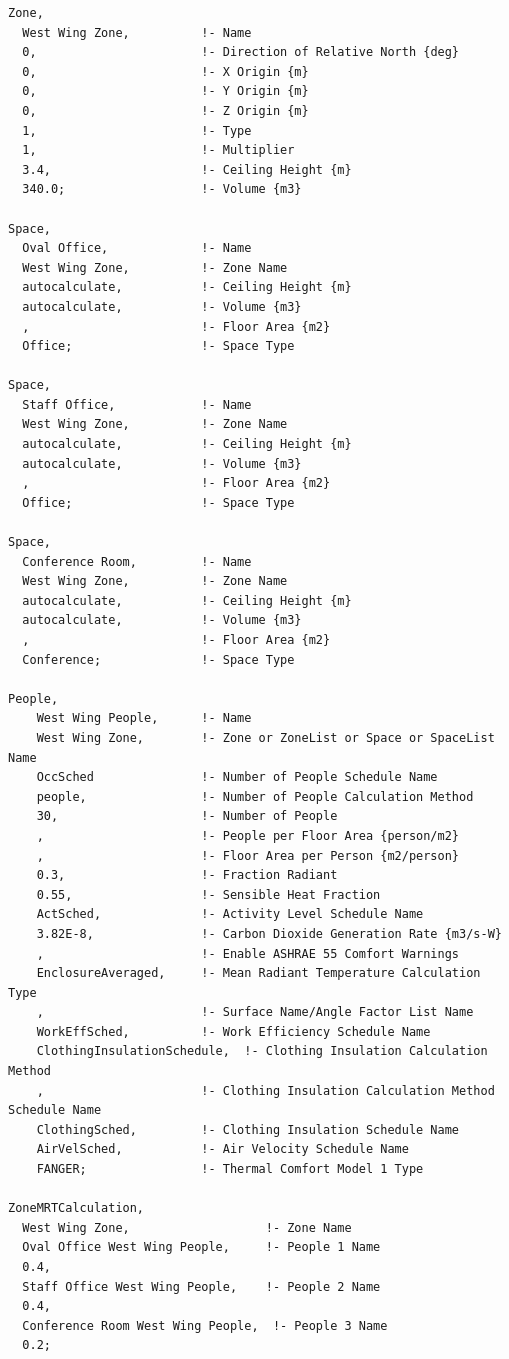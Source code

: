 \begin{lstlisting}
Zone,
  West Wing Zone,          !- Name
  0,                       !- Direction of Relative North {deg}
  0,                       !- X Origin {m}
  0,                       !- Y Origin {m}
  0,                       !- Z Origin {m}
  1,                       !- Type
  1,                       !- Multiplier
  3.4,                     !- Ceiling Height {m}
  340.0;                   !- Volume {m3}

Space,
  Oval Office,             !- Name
  West Wing Zone,          !- Zone Name
  autocalculate,           !- Ceiling Height {m}
  autocalculate,           !- Volume {m3}
  ,                        !- Floor Area {m2}
  Office;                  !- Space Type

Space,
  Staff Office,            !- Name
  West Wing Zone,          !- Zone Name
  autocalculate,           !- Ceiling Height {m}
  autocalculate,           !- Volume {m3}
  ,                        !- Floor Area {m2}
  Office;                  !- Space Type

Space,
  Conference Room,         !- Name
  West Wing Zone,          !- Zone Name
  autocalculate,           !- Ceiling Height {m}
  autocalculate,           !- Volume {m3}
  ,                        !- Floor Area {m2}
  Conference;              !- Space Type

People,
    West Wing People,      !- Name
    West Wing Zone,        !- Zone or ZoneList or Space or SpaceList Name
    OccSched               !- Number of People Schedule Name
    people,                !- Number of People Calculation Method
    30,                    !- Number of People
    ,                      !- People per Floor Area {person/m2}
    ,                      !- Floor Area per Person {m2/person}
    0.3,                   !- Fraction Radiant
    0.55,                  !- Sensible Heat Fraction
    ActSched,              !- Activity Level Schedule Name
    3.82E-8,               !- Carbon Dioxide Generation Rate {m3/s-W}
    ,                      !- Enable ASHRAE 55 Comfort Warnings
    EnclosureAveraged,     !- Mean Radiant Temperature Calculation Type
    ,                      !- Surface Name/Angle Factor List Name
    WorkEffSched,          !- Work Efficiency Schedule Name
    ClothingInsulationSchedule,  !- Clothing Insulation Calculation Method
    ,                      !- Clothing Insulation Calculation Method Schedule Name
    ClothingSched,         !- Clothing Insulation Schedule Name
    AirVelSched,           !- Air Velocity Schedule Name
    FANGER;                !- Thermal Comfort Model 1 Type

ZoneMRTCalculation,
  West Wing Zone,                   !- Zone Name
  Oval Office West Wing People,     !- People 1 Name
  0.4,
  Staff Office West Wing People,    !- People 2 Name
  0.4,
  Conference Room West Wing People,  !- People 3 Name
  0.2;
\end{lstlisting}

